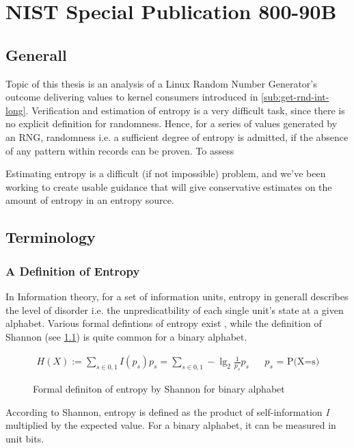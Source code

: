 \chapter{NIST Special Publication 800-90B}
\label{chap:NIST800-90B}
\section{Generall}

Topic of this thesis is an analysis of a Linux Random Number Generator's outcome delivering values to kernel consumers introduced in \ref{sub:get-rnd-int-long}. Verification and estimation of entropy is 
a very difficult task, since there is no explicit definition for randomness. Hence, for a series of values generated by an RNG, randomness i.e. a sufficient degree of entropy is admitted, if the absence of any pattern within records can be proven. 
To assess 

\cite{robert2006dieharder}


\cite{turan2015random}

Estimating entropy is a difficult (if not impossible) problem, and we've been working to create
usable guidance that will give conservative estimates on the amount of entropy in an entropy
source.
\cite{turan2015random}


\section{Terminology}
\subsection{A Definition of Entropy}
In Information theory, for a set of information units, entropy in generall describes the level of disorder i.e. the unpredicatbility of each single unit's state at a given alphabet. Various formal defintions of entropy exist \cite{hagerty2012entropy}, while the definition of Shannon (see \ref{fig:form-entropy-shan}) is quite common for a binary alphabet. 

\begin{figure}[H]
	\begin{align*}
	\displaystyle H(X) := \sum_{s \in {0,1}} I(p_s) p_s = \sum_{s \in {0,1}} -\lg_2 \frac{1}{p_s} p_s && \text{$p_s$ = P(X=s)}
	\end{align*}
	\caption{Formal definiton of entropy by Shannon for binary alphabet}
	\label{fig:form-entropy-shan}
\end{figure}
According to Shannon, entropy is defined as the product of self-information \textit{I} multiplied by the expected value. For a binary alphabet, it can be measured in unit bits. 
